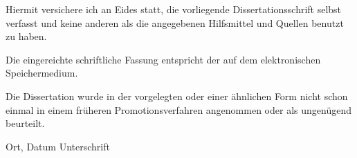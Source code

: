 
Hiermit versichere ich an Eides statt, die vorliegende Dissertationsschrift selbst verfasst und keine anderen als die angegebenen Hilfsmittel und Quellen benutzt zu haben.

\vspace{2cm}

Die eingereichte schriftliche Fassung entspricht der auf dem elektronischen Speichermedium. 

\vspace{2cm}

Die Dissertation wurde in der vorgelegten oder einer \"ahnlichen Form nicht schon einmal in einem fr\"uheren Promotionsverfahren angenommen oder als ungen\"ugend beurteilt.

\vspace{4cm}

\hspace{2cm} Ort, Datum \hfill Unterschrift \hspace{2cm}